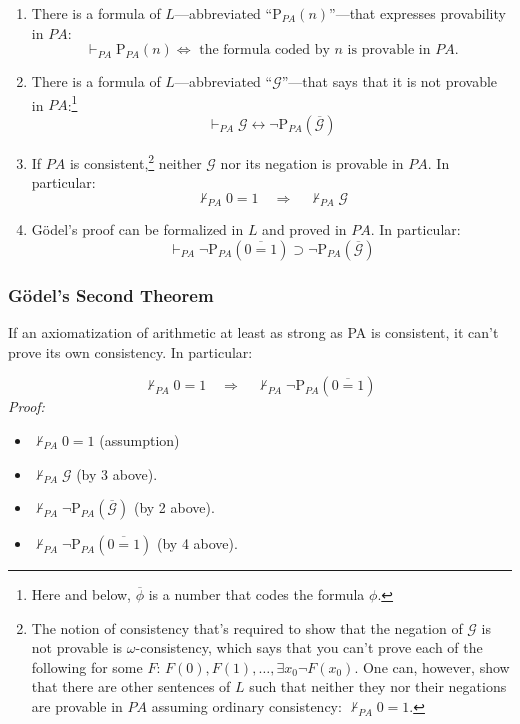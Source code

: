 \documentclass[12pt]{extarticle}
\begin{document}
\begin{enumerate}

\item There is a formula of $L$---abbreviated ``$\text{P}_{PA}(n)$''---that expresses provability in $PA$:
$$\vdash_{PA} \text{P}_{PA}(n) \Leftrightarrow \text{ the formula coded by $n$ is provable in $PA$.}$$

\item There is a formula of $L$---abbreviated ``$\mathcal{G}$''---that says that it is not provable in $PA$:\footnote{Here and below, $\overline{\phi}$ is a number that codes the formula $\phi$.}
$$\vdash_{PA} \mathcal{G} \leftrightarrow \neg\text{P}_{PA}(\overline{\mathcal{G}})$$


\item If $PA$ is consistent,\footnote{The notion of consistency that's required to show that the negation of $\mathcal{G}$ is not provable is $\omega$-consistency, which says that you can't prove each of the following for some $F$: $F(0), F(1), \dots, \exists x_0 \neg F(x_0)$. One can, however, show that there are other sentences of $L$ such that neither they nor their negations are provable in $PA$ assuming ordinary consistency: $\nvdash_{PA} 0 = 1$.
} neither $\mathcal{G}$ nor its negation is provable in $PA$. In particular:
$$\nvdash_{PA} 0 = 1 \quad \Rightarrow \quad \nvdash_{PA} \mathcal{G}$$


\item G\"odel's proof can be formalized in $L$ and proved in $PA$. In particular:
$$\vdash_{PA} \neg\text{P}_{PA}(\overline{0=1}) \supset \neg\text{P}_{PA}(\mathcal{\overline{G}})$$

\end{enumerate}


\subsubsection*{G\"odel's Second Theorem}
If an axiomatization of arithmetic at least as strong as PA is consistent, it can't prove its own consistency. In particular:

$$\nvdash_{PA} 0 = 1 \quad \Rightarrow \quad \nvdash_{PA} \neg \text{P}_{PA}(\overline{0 =1})$$
\emph{Proof:}

\begin{itemize}

\item $\nvdash_{PA} 0 = 1 $ (assumption)

\item $\nvdash_{PA} \mathcal{G}$ (by 3 above).

\item $\nvdash_{PA} \neg\text{P}_{PA}(\mathcal{\overline{G}})$ (by 2 above).

\item $\nvdash_{PA} \neg \text{P}_{PA}(\overline{0 =1})$ (by 4 above).



\end{itemize}
\end{document}
